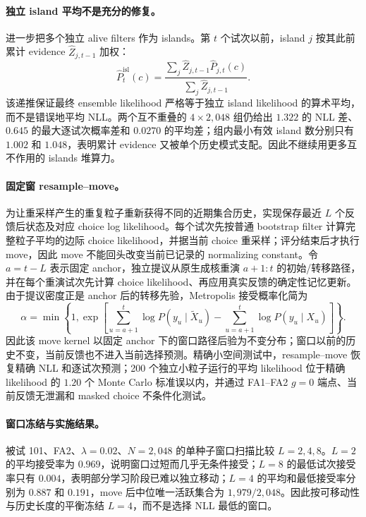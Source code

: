 \paragraph{独立 island 平均不是充分的修复。}
进一步把多个独立 alive filters 作为 islands。第 $t$ 个试次以前，island $j$ 按其此前累计 evidence $\widehat Z_{j,t-1}$ 加权：
\begin{equation}
 \widehat P^{\mathrm{isl}}_t(c)=
 \frac{\sum_j\widehat Z_{j,t-1}\widehat P_{j,t}(c)}
      {\sum_j\widehat Z_{j,t-1}}.
\end{equation}
该递推保证最终 ensemble likelihood 严格等于独立 island likelihood 的算术平均，而不是错误地平均 NLL。两个互不重叠的 $4\times2{,}048$ 组仍给出 $1.322$ 的 NLL 差、$0.645$ 的最大逐试次概率差和 $0.0270$ 的平均差；组内最小有效 island 数分别只有 $1.002$ 和 $1.048$，表明累计 evidence 又被单个历史模式支配。因此不继续用更多互不作用的 islands 堆算力。

\paragraph{固定窗 resample--move。}
为让重采样产生的重复粒子重新获得不同的近期集合历史，实现保存最近 $L$ 个反馈后状态及对应 choice log likelihood。每个试次先按普通 bootstrap filter 计算完整粒子平均的边际 choice likelihood，并据当前 choice 重采样；评分结束后才执行 move，因此 move 不能回头改变当前已记录的 normalizing constant。令 $a=t-L$ 表示固定 anchor，独立提议从原生成核重演 $a+1{:}t$ 的初始/转移路径，并在每个重演试次先计算 choice likelihood、再应用真实反馈的确定性记忆更新。由于提议密度正是 anchor 后的转移先验，Metropolis 接受概率化简为
\begin{equation}
 \alpha=\min\left\{1,
 \exp\left[
   \sum_{u=a+1}^{t}\log P(y_u\mid\widetilde X_u)
   -\sum_{u=a+1}^{t}\log P(y_u\mid X_u)
 \right]\right\}.
 \label{eq:model0804-resample-move-acceptance}
\end{equation}
因此该 move kernel 以固定 anchor 下的窗口路径后验为不变分布；窗口以前的历史不变，当前反馈也不进入当前选择预测。精确小空间测试中，resample--move 恢复精确 NLL 和逐试次预测；200 个独立小粒子运行的平均 likelihood 位于精确 likelihood 的 $1.20$ 个 Monte Carlo 标准误以内，并通过 FA1--FA2 $g=0$ 端点、当前反馈无泄漏和 masked choice 不条件化测试。

\paragraph{窗口冻结与实施结果。}
被试 101、FA2、$\lambda=0.02$、$N=2{,}048$ 的单种子窗口扫描比较 $L=2,4,8$。$L=2$ 的平均接受率为 $0.969$，说明窗口过短而几乎无条件接受；$L=8$ 的最低试次接受率只有 $0.004$，表明部分学习阶段已难以独立移动；$L=4$ 的平均和最低接受率分别为 $0.887$ 和 $0.191$，move 后中位唯一活跃集合为 $1{,}979/2{,}048$。因此按可移动性与历史长度的平衡冻结 $L=4$，而不是选择 NLL 最低的窗口。

